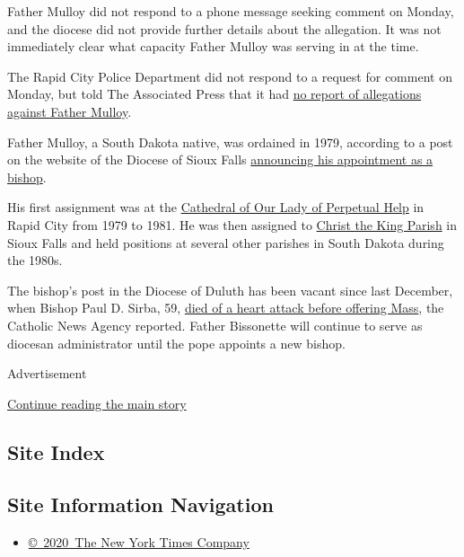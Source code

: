 Father Mulloy did not respond to a phone message seeking comment on
Monday, and the diocese did not provide further details about the
allegation. It was not immediately clear what capacity Father Mulloy was
serving in at the time.

The Rapid City Police Department did not respond to a request for
comment on Monday, but told The Associated Press that it had
\href{https://apnews.com/22a3998a4fe521384c6beabd44013764}{no report of
allegations against Father Mulloy}.

Father Mulloy, a South Dakota native, was ordained in 1979, according to
a post on the website of the Diocese of Sioux Falls
\href{https://www.sfcatholic.org/bishopsbulletin/pope-francis-names-father-michel-mulloy-of-diocese-of-rapid-city-as-bishop-of-duluth/}{announcing
his appointment as a bishop}.

His first assignment was at the
\href{https://www.cathedralolph.org/}{Cathedral of Our Lady of Perpetual
Help} in Rapid City from 1979 to 1981. He was then assigned to
\href{http://www.ctkparish-sf.org/}{Christ the King Parish} in Sioux
Falls and held positions at several other parishes in South Dakota
during the 1980s.

The bishop's post in the Diocese of Duluth has been vacant since last
December, when Bishop Paul D. Sirba, 59,
\href{https://www.catholicnewsagency.com/news/duluths-bishop-paul-sirba-dies-unexpectedly-at-59-15815}{died
of a heart attack before offering Mass}, the Catholic News Agency
reported. Father Bissonette will continue to serve as diocesan
administrator until the pope appoints a new bishop.

Advertisement

\protect\hyperlink{after-bottom}{Continue reading the main story}

\hypertarget{site-index}{%
\subsection{Site Index}\label{site-index}}

\hypertarget{site-information-navigation}{%
\subsection{Site Information
Navigation}\label{site-information-navigation}}

\begin{itemize}
\tightlist
\item
  \href{https://help.nytimes3xbfgragh.onion/hc/en-us/articles/115014792127-Copyright-notice}{©~2020~The
  New York Times Company}
\end{itemize}

